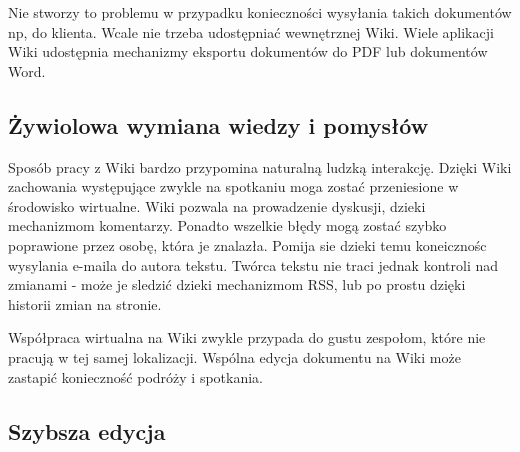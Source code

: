 \documentclass{article}
\begin{document}
		Nie stworzy to problemu w przypadku konieczności wysyłania takich dokumentów np, do klienta. Wcale nie trzeba udostępniać wewnętrznej Wiki. Wiele aplikacji Wiki udostępnia mechanizmy eksportu dokumentów do PDF lub dokumentów Word.

	\subsection{Żywiolowa wymiana wiedzy i pomysłów}




		Sposób pracy z Wiki bardzo przypomina naturalną ludzką interakcję. Dzięki Wiki zachowania występujące zwykle na spotkaniu moga zostać przeniesione w środowisko wirtualne. Wiki pozwala na prowadzenie dyskusji, dzieki mechanizmom komentarzy. Ponadto wszelkie błędy mogą zostać szybko poprawione przez osobę, która je znalazła. Pomija sie dzieki temu koneicznośc wysylania e-maila do autora tekstu. Twórca tekstu nie traci jednak kontroli nad zmianami - może je sledzić dzieki mechanizmom RSS, lub po prostu dzięki historii zmian na stronie.

		Współpraca wirtualna na Wiki zwykle przypada do gustu zespołom, które nie pracują w tej samej lokalizacji. Wspólna edycja dokumentu na Wiki może zastapić konieczność podróży i spotkania. 

	\subsection{Szybsza edycja}

\end{document}
